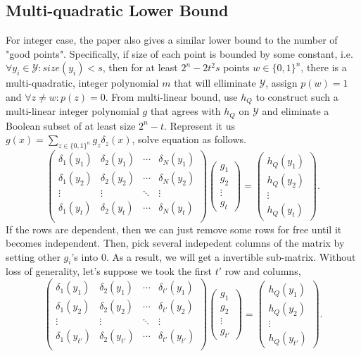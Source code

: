 \documentclass{article}
\begin{document}
\subsection{Multi-quadratic Lower Bound}
For integer case, the paper also gives a similar lower bound to the number of "good points". Specifically, if size of each point is bounded by some constant, i.e. $\forall y_i\in\mathcal{Y}: size(y_i)<s$, then for at least  $2^n-2t^2s$ points $w\in\{0,1\}^n$, there is a multi-quadratic, integer polynomial $m$ that will elliminate $\mathcal{Y}$, assign $p(w)=1$ and $\forall z\neq w: p(z)=0$. From multi-linear bound, use $h_Q$ to construct such a multi-linear integer polynomial $g$ that agrees with $h_Q$ on $\mathcal{Y}$ and eliminate a Boolean subset of at least size $2^n-t$. Represent it us $g(x)=\sum_{z\in\{0,1\}^n}g_z\delta_z(x)$, solve equation as follows.
$$
\begin{pmatrix}
\delta_1(y_1)&\delta_2(y_1)&\cdots&\delta_N(y_1)\\
\delta_1(y_2)&\delta_2(y_2)&\cdots&\delta_N(y_2)\\
\vdots&\vdots&\ddots&\vdots\\
\delta_1(y_t)&\delta_2(y_t)&\cdots&\delta_N(y_t)\\
\end{pmatrix}
\begin{pmatrix}
g_1\\g_2\\\vdots\\g_t
\end{pmatrix}
=
\begin{pmatrix}
h_Q(y_1)\\h_Q(y_2)\\\vdots\\h_Q(y_t)
\end{pmatrix}
.
$$
If the rows are dependent, then we can just remove some rows for free until it becomes independent. Then, pick several indepedent columns of the matrix by setting other $g_i$'s into $0$. As a result, we will get a invertible sub-matrix. Without loss of generality, let's suppose we took the first $t'$ row and columns,
$$
\begin{pmatrix}
\delta_1(y_1)&\delta_2(y_1)&\cdots&\delta_{t'}(y_1)\\
\delta_1(y_2)&\delta_2(y_2)&\cdots&\delta_{t'}(y_2)\\
\vdots&\vdots&\ddots&\vdots\\
\delta_1(y_{t'})&\delta_2(y_{t'})&\cdots&\delta_{t'}(y_{t'})\\
\end{pmatrix}
\begin{pmatrix}
g_1\\g_2\\\vdots\\g_{t'}
\end{pmatrix}
=
\begin{pmatrix}
h_Q(y_1)\\h_Q(y_2)\\\vdots\\h_Q(y_{t'})
\end{pmatrix}
.
$$
\end{document}
